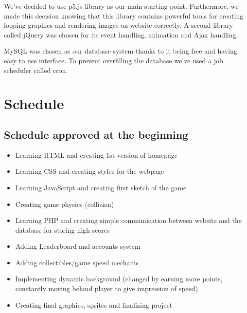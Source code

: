 \documentclass[oneside,a4paper,11pt]{report}
\begin{document}
\par
We've decided to use p5.js library as our main starting point. Furthermore, we made this decision knowing that this library contains powerful tools for creating looping graphics and rendering images on website correctly. A second library called jQuery was chosen for its event handling, animation and Ajax handling.

\par
MySQL was chosen as our database system thanks to it being free and having easy to use interface. To prevent overfilling the database we've used a job scheduler called cron.


\chapter{Schedule}
\section{Schedule approved at the beginning}
\begin{itemize}
	\item Learning HTML and creating 1st version of homepage
	\item Learning CSS and creating styles for the webpage
	\item Learning JavaScript and creating first sketch of the game
	\item Creating game physics (collision)
	\item Learning PHP and creating simple communication between website and the database for storing high scores
	\item Adding Leaderboard and accounts system
	\item Adding collectibles/game speed mechanic
	\item Implementing dynamic background (changed by earning more points, constantly moving behind player to give impression of speed)
	\item Creating final graphics, sprites and finalizing project
\end{itemize}

\newpage
\end{document}
